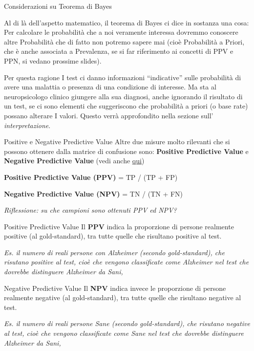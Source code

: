 \documentclass[
  ignorenonframetext,
]{beamer}
\begin{document}
\begin{frame}{Considerazioni su Teorema di Bayes}
\label{considerazioni-su-teorema-di-bayes}
\small

Al di là dell'aspetto matematico, il teorema di Bayes ci dice in
sostanza una cosa: Per calcolare le probabilità che a noi veramente
interessa dovremmo conoscere altre Probabilità che di fatto non potremo
sapere mai (cioè Probabilità a Priori, che è anche associata a
Prevalenza, se si far riferimento ai concetti di PPV e PPN, si vedano
prossime slides).

Per questa ragione I test ci danno informazioni ``indicative'' sulle
probabilità di avere una malattia o presenza di una condizione di
interesse. Ma sta al neuropsicologo clinico giungere alla sua diagnosi,
anche ignorando il risultato di un test, se ci sono elementi che
suggeriscono che probabilità a priori (o base rate) possano alterare I
valori. Questo verrà approfondito nella sezione sull'
\emph{interpretazione}.
\end{frame}

\begin{frame}{Positive e Negative Predictive Value}
\label{positive-e-negative-predictive-value}
Altre due misure molto rilevanti che si possono ottenere dalla matrice
di confusione sono: \textbf{Positive Predictive Value} e
\textbf{Negative Predictive Value} (vedi anche
\href{https://epidemiology.sruc.ac.uk/shiny/apps/predictive_values/}{\underline{qui}})
\vfill

\textbf{Positive Predictive Value (PPV)} = TP / (TP + FP)

\textbf{Negative Predictive Value (NPV)} = TN / (TN + FN) \pause

\emph{Riflessione: su che campioni sono ottenuti PPV ed NPV?}
\end{frame}

\begin{frame}{Positive Predictive Value}
\label{positive-predictive-value}
Il \textbf{PPV} indica la proporzione di persone realmente positive (al
gold-standard), tra tutte quelle che risultano positive al test.

\emph{Es. il numero di reali persone con Alzheimer (secondo
gold-standard), che risutano positive al test, cioè che vengono
classificate come Alzheimer nel test che dovrebbe distinguere Alzheimer
da Sani,}
\end{frame}

\begin{frame}{Negative Predictive Value}
\label{negative-predictive-value}
Il \textbf{NPV} indica invece le proporzione di persone realmente
negative (al gold-standard), tra tutte quelle che risultano negative al
test.

\emph{Es. il numero di reali persone Sane (secondo gold-standard), che
risutano negative al test, cioè che vengono classificate come Sane nel
test che dovrebbe distinguere Alzheimer da Sani,}
\end{frame}
\end{document}
